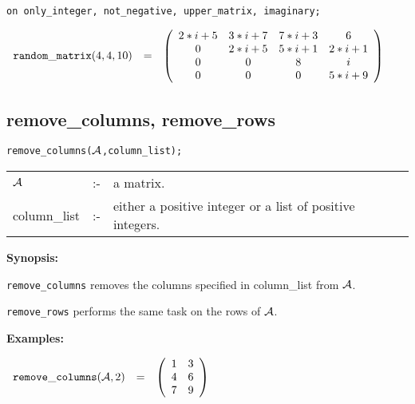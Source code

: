 \vspace*{0.2in}
\hspace*{0.165in}
{\tt on only\_integer, not\_negative, upper\_matrix, imaginary;}
\begin{flushleft}
\hspace*{0.12in}
\begin{math}
\begin{array}{ccc}
{\tt random\_matrix}(4,4,10) & = &
\left( \begin{array}{cccc} 2*i+5 & 3*i+7 & 7*i+3 & 6 \\ 0 & 2*i+5 &
5*i+1 & 2*i+1 \\ 0 & 0 & 8 & i \\ 0 & 0 & 0& 5*i+9
\end{array} \right)
\end{array}
\end{math}
\end{flushleft}


\subsection{remove\_columns, remove\_rows}


\hspace*{0.175in} {\tt remove\_columns(${\cal A}$,column\_list);}

\hspace*{0.1in}
\begin{tabular}{l l l}
${\cal A}$   &:-& a matrix. \\
column\_list &:-& either a positive integer or a list of
                  positive integers.
\end{tabular}

{\bf Synopsis:} %

\hspace*{0.175in} {\tt remove\_columns} removes the columns specified in
                column\_list from ${\cal A}$.

\hspace*{0.175in} {\tt remove\_rows} performs the same task on the rows
                of ${\cal A}$.

{\bf Examples:}

\begin{flushleft}
\hspace*{0.1in}
\begin{math}
\begin{array}{ccc}
{\tt remove\_columns}({\cal A},2) & = &
        \left( \begin{array}{cc} 1 & 3 \\ 4 & 6 \\ 7 & 9
 \end{array} \right)
\end{array}
\end{math}
\end{flushleft}

